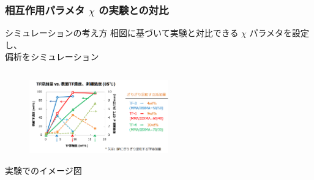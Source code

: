 \documentclass[unicode,12pt]{beamer}%
\begin{document}
\begin{frame}\frametitle{相互作用パラメタ $\chi$ の実験との対比}

\begin{alertblock}{シミュレーションの考え方}
相図に基づいて実験と対比できる $\chi$ パラメタを設定し、\\
偏析をシミュレーション
\end{alertblock}

\begin{columns}
	\begin{column}{6.0cm}
		\vspace{-0.5\baselineskip}
		\begin{figure}[htbp]
			\begin{center}
				\includegraphics[width=60mm]{nakamura-2.png}
			\end{center}
		\end{figure}
		\begin{center}
			\vspace{-0.5\baselineskip}
			{\footnotesize 実験でのイメージ図}
		\end{center}
	\end{column}
	\begin{column}{6.0cm}
		\vspace{-1\baselineskip}

\end{column}
\end{columns}
\end{frame}
\end{document}
